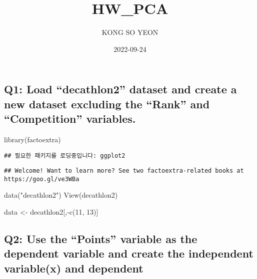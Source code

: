 \documentclass[
]{article}
\title{HW\_PCA}
\author{KONG SO YEON}
\date{2022-09-24}
\newenvironment{Shaded}{\begin{snugshade}}{\end{snugshade}}
\newcommand{\DecValTok}[1]{\textcolor[rgb]{0.00,0.00,0.81}{#1}}
\newcommand{\FunctionTok}[1]{\textcolor[rgb]{0.00,0.00,0.00}{#1}}
\newcommand{\NormalTok}[1]{#1}
\newcommand{\OtherTok}[1]{\textcolor[rgb]{0.56,0.35,0.01}{#1}}
\newcommand{\SpecialCharTok}[1]{\textcolor[rgb]{0.00,0.00,0.00}{#1}}
\newcommand{\StringTok}[1]{\textcolor[rgb]{0.31,0.60,0.02}{#1}}
\begin{document}
\maketitle

\hypertarget{q1-load-decathlon2-dataset-and-create-a-new-dataset-excluding-the-rank-and-competition-variables.}{%
\subsection{Q1: Load ``decathlon2'' dataset and create a new dataset
excluding the ``Rank'' and ``Competition''
variables.}\label{q1-load-decathlon2-dataset-and-create-a-new-dataset-excluding-the-rank-and-competition-variables.}}

\begin{Shaded}
\begin{Highlighting}[]
\FunctionTok{library}\NormalTok{(factoextra)}
\end{Highlighting}
\end{Shaded}

\begin{verbatim}
## 필요한 패키지를 로딩중입니다: ggplot2
\end{verbatim}

\begin{verbatim}
## Welcome! Want to learn more? See two factoextra-related books at https://goo.gl/ve3WBa
\end{verbatim}

\begin{Shaded}
\begin{Highlighting}[]
\FunctionTok{data}\NormalTok{(}\StringTok{"decathlon2"}\NormalTok{)}
\FunctionTok{View}\NormalTok{(decathlon2)}

\NormalTok{data }\OtherTok{\textless{}{-}}\NormalTok{ decathlon2[,}\SpecialCharTok{{-}}\FunctionTok{c}\NormalTok{(}\DecValTok{11}\NormalTok{, }\DecValTok{13}\NormalTok{)]}
\end{Highlighting}
\end{Shaded}

\hypertarget{q2-use-the-points-variable-as-the-dependent-variable-and-create-the-independent-variablex-and-dependent}{%
\subsection{Q2: Use the ``Points'' variable as the dependent variable
and create the independent variable(x) and
dependent}\label{q2-use-the-points-variable-as-the-dependent-variable-and-create-the-independent-variablex-and-dependent}}
\end{document}
